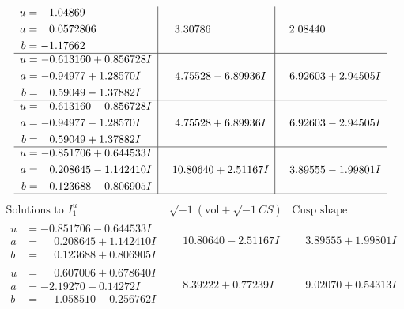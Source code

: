 \documentclass[1p]{elsarticle_modified}
\theoremstyle{definition}
\newcommand{\I}{\sqrt{-1}}
\begin{document}
$$\begin{array}{c|c|c}
\begin{aligned}
u &= -1.04869\phantom{ +0.000000I} \\
a &= \phantom{-}0.0572806\phantom{ +0.000000I} \\
b &= -1.17662\phantom{ +0.000000I}\end{aligned}
 & \phantom{-}3.30786\phantom{ +0.000000I} & \phantom{-}2.08440\phantom{ +0.000000I} \\ \hline\begin{aligned}
u &= -0.613160 + 0.856728 I \\
a &= -0.94977 + 1.28570 I \\
b &= \phantom{-}0.59049 - 1.37882 I\end{aligned}
 & \phantom{-}4.75528 - 6.89936 I & \phantom{-}6.92603 + 2.94505 I \\ \hline\begin{aligned}
u &= -0.613160 - 0.856728 I \\
a &= -0.94977 - 1.28570 I \\
b &= \phantom{-}0.59049 + 1.37882 I\end{aligned}
 & \phantom{-}4.75528 + 6.89936 I & \phantom{-}6.92603 - 2.94505 I \\ \hline\begin{aligned}
u &= -0.851706 + 0.644533 I \\
a &= \phantom{-}0.208645 - 1.142410 I \\
b &= \phantom{-}0.123688 - 0.806905 I\end{aligned}
 & \phantom{-}10.80640 + 2.51167 I & \phantom{-}3.89555 - 1.99801 I\\
 \hline 
 \end{array}$$\newpage$$\begin{array}{c|c|c}  
\text{Solutions to }I^u_{1}& \I (\text{vol} + \sqrt{-1}CS) & \text{Cusp shape}\\
 \hline 
\begin{aligned}
u &= -0.851706 - 0.644533 I \\
a &= \phantom{-}0.208645 + 1.142410 I \\
b &= \phantom{-}0.123688 + 0.806905 I\end{aligned}
 & \phantom{-}10.80640 - 2.51167 I & \phantom{-}3.89555 + 1.99801 I \\ \hline\begin{aligned}
u &= \phantom{-}0.607006 + 0.678640 I \\
a &= -2.19270 - 0.14272 I \\
b &= \phantom{-}1.058510 - 0.256762 I\end{aligned}
 & \phantom{-}8.39222 + 0.77239 I & \phantom{-}9.02070 + 0.54313 I \\ \hline\begin{aligned}

\end{aligned}
\end{array}$$
\end{document}
